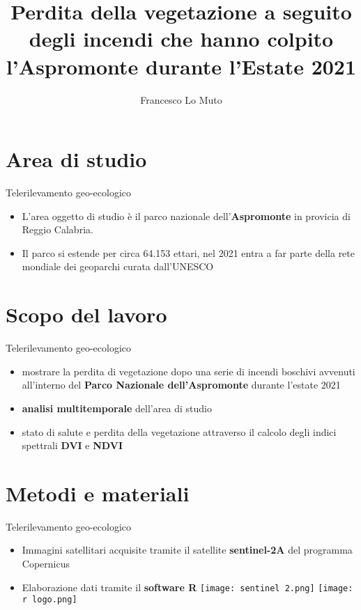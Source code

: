\documentclass{beamer}
\title{Perdita della vegetazione a seguito degli incendi che hanno colpito l'Aspromonte durante l'Estate 2021}
\author{Francesco Lo Muto}
\begin{document}
\maketitle
\AtBeginSection
{	
\begin{frame}
\frametitle{}
\end{frame}
}
\section{Area di studio}
\begin{frame}{Telerilevamento geo-ecologico}
\begin{itemize}
    \item L’area oggetto di studio è il parco nazionale dell'\textbf{Aspromonte} in provicia di Reggio Calabria. 
    \item Il parco si estende per circa 64.153 ettari, nel 2021 entra a far parte della rete mondiale dei geoparchi curata dall'UNESCO
\end{itemize}  
\end{frame}
\section{Scopo del lavoro}
\begin{frame}{Telerilevamento geo-ecologico}
\begin{itemize}
\item mostrare la perdita di vegetazione dopo una serie di incendi boschivi avvenuti all'interno del \textbf{Parco Nazionale dell'Aspromonte} durante l'estate 2021
\item \textbf{analisi multitemporale} dell'area di studio
\item stato di salute e perdita della vegetazione attraverso il calcolo degli indici spettrali \textbf{DVI} e \textbf{NDVI}
\end{itemize}    
\end{frame}
\section{Metodi e materiali}
\begin{frame}{Telerilevamento geo-ecologico}
\begin{itemize}
    \item Immagini satellitari acquisite tramite il satellite \textbf{sentinel-2A} del programma Copernicus
    \item Elaborazione dati tramite il \textbf{software R}
    \texttt{[image: sentinel 2.png]}
    \texttt{[image: r logo.png]}
\end{itemize} 
\end{frame}
\end{document}
